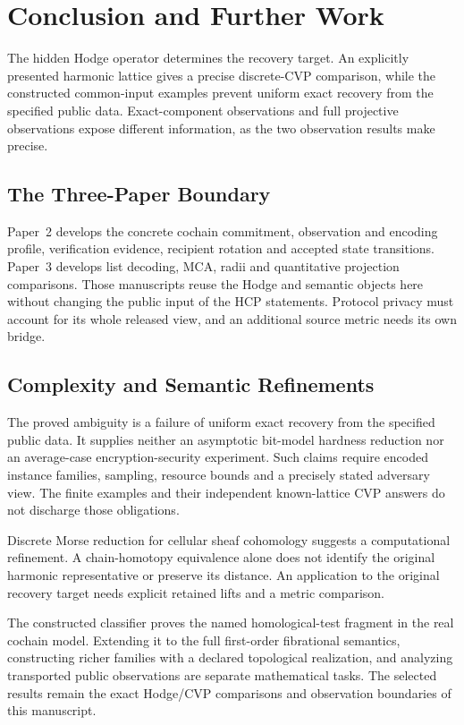\section{Conclusion and Further Work}

The hidden Hodge operator determines the recovery target. An explicitly
presented harmonic lattice gives a precise discrete-CVP comparison, while
the constructed common-input examples prevent uniform exact recovery from
the specified public data. Exact-component observations and full projective
observations expose different information, as the two observation results
make precise.

\subsection{The Three-Paper Boundary}

Paper~2 \cite{vanDerVlugt2026protocol} develops the concrete cochain commitment,
observation and encoding profile, verification evidence, recipient rotation
and accepted state transitions. Paper~3 \cite{vanDerVlugt2026proximity}
develops list decoding, MCA, radii and quantitative projection comparisons.
Those manuscripts reuse the Hodge and semantic objects here without changing
the public input of the HCP statements. Protocol privacy must account for its
whole released view, and an additional source metric needs its own bridge.

\subsection{Complexity and Semantic Refinements}

The proved ambiguity is a failure of uniform exact recovery from the specified
public data. It supplies neither an asymptotic bit-model hardness reduction
nor an average-case encryption-security experiment. Such claims require
encoded instance families, sampling, resource bounds and a precisely stated
adversary view. The finite examples and their independent known-lattice CVP
answers do not discharge those obligations.

Discrete Morse reduction for cellular sheaf cohomology
\cite{curryGhristNanda2015morse} suggests a computational refinement.
A chain-homotopy equivalence alone does not identify the original harmonic
representative or preserve its distance. An application to the original
recovery target needs explicit retained lifts and a metric comparison.

The constructed classifier proves the named homological-test fragment in the
real cochain model. Extending it to the full first-order fibrational semantics,
constructing richer families with a declared topological realization, and
analyzing transported public observations are separate mathematical tasks.
The selected results remain the exact Hodge/CVP comparisons and observation
boundaries of this manuscript.
